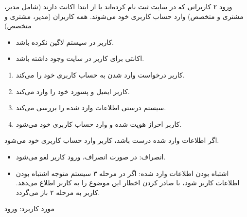 \usecase
{ورود}
{۲}
{کاربرانی که در سایت ثبت‌ نام کرده‌اند یا از ابتدا اکانت دارند (شامل مدیر، مشتری و متخصص) وارد حساب کاربری خود می‌شوند.}
{همه کاربران (مدیر، مشتری و متخصص)}
{}
{
		\begin{itemize}
		\item
		کاربر در سیستم لاگین نکرده باشد.
		\item
		اکانتی برای کاربر در سایت وجود داشته باشد.
	\end{itemize}
	
}
{
\begin{enumerate}
	\item 
	کاربر درخواست وارد شدن به حساب کاربری خود را می‌کند.
	
	
	\item 
	کاربر ایمیل و پسورد خود را وارد می‌کند.
	
	\item
	سیستم درستی اطلاعات وارد شده را بررسی می‌کند.
	
	\item
	کاربر احراز هویت شده و وارد حساب کاربری خود می‌شود.
\end{enumerate}
}{اگر اطلاعات وارد شده درست باشد، کاربر وارد حساب کاربری خود می‌شود.}
{	
	
	\begin{itemize}
	\item
	 انصراف: در صورت انصراف، ورود کاربر لغو می‌شود.
	
	\item
	اشتباه بودن اطلاعات وارد شده: اگر در مرحله ۳ سیستم متوجه اشتباه بودن اطلاعات کاربر شود، با صادر کردن اخطار این موضوع را به کاربر اطلاع می‌دهد. کاربر به مرحله ۲ باز می‌گردد.
	\end{itemize}
}
{مورد کاربرد: ورود }



